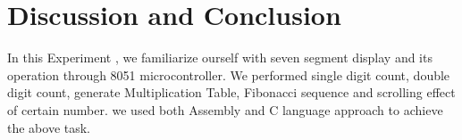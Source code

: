 \documentclass{article}
\begin{document}

\pagebreak

\section{Discussion and Conclusion}

In this Experiment , we familiarize ourself with seven segment display and its operation through 8051 microcontroller.
We performed single digit count, double digit count, generate Multiplication Table, Fibonacci sequence and scrolling effect  of certain number.
we used both Assembly and C language approach to achieve the above  task.
\end{document}
